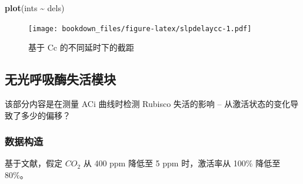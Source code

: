 \documentclass[
]{krantz}
\makeatletter
\newenvironment{Shaded}{\begin{snugshade}}{\end{snugshade}}
\newcommand{\KeywordTok}[1]{\textcolor[rgb]{0.13,0.29,0.53}{\textbf{#1}}}
\newcommand{\NormalTok}[1]{#1}
\newcommand{\OperatorTok}[1]{\textcolor[rgb]{0.81,0.36,0.00}{\textbf{#1}}}
\newcommand{\StringTok}[1]{\textcolor[rgb]{0.31,0.60,0.02}{#1}}
\newenvironment{kframe}{%
\medskip{}
\setlength{\fboxsep}{.8em}
 \def\at@end@of@kframe{}%
 \ifinner\ifhmode%
  \def\at@end@of@kframe{\end{minipage}}%
  \begin{minipage}{\columnwidth}%
 \fi\fi%
 \def\FrameCommand##1{\hskip\@totalleftmargin \hskip-\fboxsep
 \colorbox{shadecolor}{##1}\hskip-\fboxsep
     \hskip-\linewidth \hskip-\@totalleftmargin \hskip\columnwidth}%
 \MakeFramed {\advance\hsize-\width
   \@totalleftmargin\z@ \linewidth\hsize
   \@setminipage}}%
 {\par\unskip\endMakeFramed%
 \at@end@of@kframe}
\renewenvironment{Shaded}{\begin{kframe}}{\end{kframe}}
\makeatother
\begin{document}
\begin{Shaded}
\begin{Highlighting}[]
\KeywordTok{plot}\NormalTok{(ints }\OperatorTok{\textasciitilde{}}\StringTok{ }\NormalTok{dels)}
\end{Highlighting}
\end{Shaded}

\begin{figure}
\centering
\texttt{[image: bookdown\_files/figure-latex/slpdelaycc-1.pdf]}
\caption{\label{fig:slpdelaycc}基于 Cc 的不同延时下的截距}
\end{figure}

\hypertarget{multi7}{%
\subsection{无光呼吸酶失活模块}\label{multi7}}

该部分内容是在测量 ACi 曲线时检测 Rubisco 失活的影响 -- 从激活状态的变化导致了多少的偏移？

\hypertarget{multi8}{%
\subsubsection{数据构造}\label{multi8}}

基于文献，假定 \(CO_2\) 从 400 ppm 降低至 5 ppm 时，激活率从 100\% 降低至 80\%。
\end{document}
